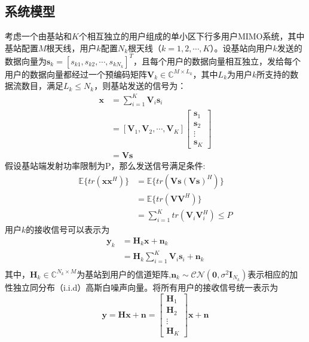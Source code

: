 \subsection{系统模型}
考虑一个由基站和$K$个相互独立的用户组成的单小区下行多用户MIMO系统，其中基站配置$M$根天线，用户$k$配置$N_k$根天线（$k=1,2,\cdots,K$）。设基站向用户$k$发送的数据向量为$\bm{s}_k=[s_{k1},s_{k2},\cdots,s_{kN_k}]^T$，且每个用户的数据向量相互独立，发给每个用户的数据向量都经过一个预编码矩阵$\bm{V}_k\in \mathbb{C}^{M\times L_k}$，其中$L_k$为用户$k$所支持的数据流数目，满足$L_k\leq N_k$，则基站发送的信号为：
\begin{equation}
    \begin{aligned}
        \bm{x}&=\sum_{i=1}^K\bm{V}_i\bm{s}_i \\
        &=[\bm{V}_1,\bm{V}_2,\cdots,\bm{V}_K]\begin{bmatrix}
            \bm{s}_1 \\
            \bm{s}_2 \\
            \vdots \\
            \bm{s}_K            
        \end{bmatrix} \\
        &= \bm{V}\bm{s}
    \end{aligned}
\end{equation}
假设基站端发射功率限制为P，那么发送信号满足条件:
\begin{equation}
    \begin{aligned}
        \mathbb{E}\{tr(\bm{x}\bm{x}^H)\}&=\mathbb{E}\{tr(\bm{Vs}(\bm{Vs})^H)\} \\
        &=\mathbb{E}\{tr(\bm{V}\bm{V}^H)\} \\
        &=\sum_{i=1}^{K}tr(\bm{V}_i\bm{V}_i^H)\leq P
    \end{aligned}
    \label{dkjgdsjgjsdkh}
\end{equation}
用户$k$的接收信号可以表示为
\begin{equation}
    \begin{aligned}
    \bm{y}_k&=\bm{H}_k\bm{x} + \bm{n}_k \\
    &=\bm{H}_k\sum_{i=1}^{K}\bm{V}_i\bm{s}_i + \bm{n}_k \\
    \end{aligned}
    \label{jhagdjasgdj}
\end{equation}
其中，$\bm{H}_k\in \mathbb{C}^{N_k\times M}$为基站到用户的信道矩阵,$\bm{n}_k\sim \mathcal{CN}(\bm{0},\sigma^2 \bm{I}_{N_k}) $表示相应的加性独立同分布（i.i.d）高斯白噪声向量。将所有用户的接收信号统一表示为
\begin{equation}
    \bm{y}=\bm{H}\bm{x}+\bm{n}=\begin{bmatrix}
        \bm{H}_1 \\
        \bm{H}_2 \\
        \vdots \\
        \bm{H}_K 
    \end{bmatrix}
    \bm{x}+\bm{n}
\end{equation}\par 

